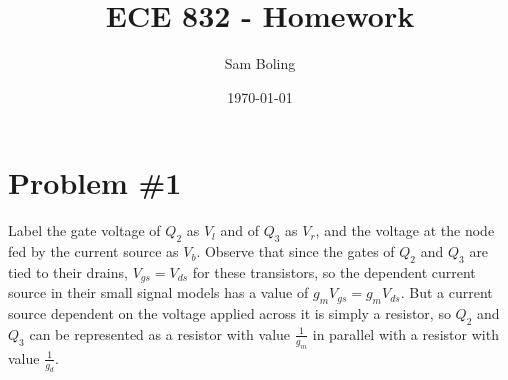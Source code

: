 \documentclass{article}
\title{ECE 832 - Homework}
\author{Sam Boling}
\date{\today}
\begin{document}
\maketitle

\section*{Problem \#1}

Label the gate voltage of $Q_2$ as $V_l$ and of $Q_3$ as $V_r$, and the
voltage at the node fed by the current source as $V_b$. Observe that since
the gates of $Q_2$ and $Q_3$ are tied to their drains, $V_{gs} = V_{ds}$ for
these transistors, so the dependent current source in their small signal models
has a value of $g_m V_{gs} = g_m V_{ds}$. But a current source dependent on the
voltage applied across it is simply a resistor, so $Q_2$ and $Q_3$ can be 
represented as a resistor with value $\frac{1}{g_m}$ in parallel with a 
resistor with value $\frac{1}{g_d}$.
\end{document}
